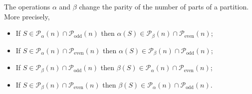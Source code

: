 \begin{lemma}\label{lemma:alpha-beta-change-parity}\leanok
The operations $\alpha$ and $\beta$ change the parity of the number of parts of a partition. More precisely,
\begin{itemize}
\item If $S\in \mathcal{P}_\alpha(n)\cap\mathcal{P}_{\mathrm{odd}}(n) $ then  $\alpha(S) \in \mathcal{P}_\beta(n)\cap\mathcal{P}_{\mathrm{even}}(n) $;
\item If $S\in \mathcal{P}_\alpha(n)\cap\mathcal{P}_{\mathrm{even}}(n) $ then  $\alpha(S) \in \mathcal{P}_\beta(n)\cap\mathcal{P}_{\mathrm{odd}}(n) $;
\item If $S\in \mathcal{P}_\beta(n)\cap\mathcal{P}_{\mathrm{odd}}(n) $ then  $\beta(S) \in \mathcal{P}_\alpha(n)\cap\mathcal{P}_{\mathrm{even}}(n) $;
\item If $S\in \mathcal{P}_\beta(n)\cap\mathcal{P}_{\mathrm{even}}(n) $ then  $\beta(S) \in \mathcal{P}_\alpha(n)\cap\mathcal{P}_{\mathrm{odd}}(n) $.
\end{itemize}
\end{lemma}
